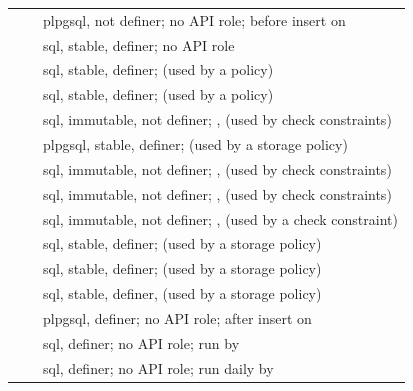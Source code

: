 \begin{longtable}{@{}L{58mm}L{24mm}L{\dimexpr\linewidth-82mm-4\tabcolsep\relax}@{}}
   &  & plpgsql, not definer; no API role; before insert on  \\
   &  & sql, stable, definer; no API role \\
   &  & sql, stable, definer;  (used by a policy) \\
   &  & sql, stable, definer;  (used by a policy) \\
   &  & sql, immutable, not definer; ,  (used by check constraints) \\
   &  & plpgsql, stable, definer;  (used by a storage policy) \\
   &  & sql, immutable, not definer; ,  (used by check constraints) \\
   &  & sql, immutable, not definer; ,  (used by check constraints) \\
   &  & sql, immutable, not definer; ,  (used by a check constraint) \\
   &  & sql, stable, definer;  (used by a storage policy) \\
   &  & sql, stable, definer;  (used by a storage policy) \\
   &  & sql, stable, definer,  (used by a storage policy) \\
   &  & plpgsql, definer; no API role; after insert on  \\
   &  & sql, definer; no API role; run by  \\
   &  & sql, definer; no API role; run daily by  \\

\end{longtable}
